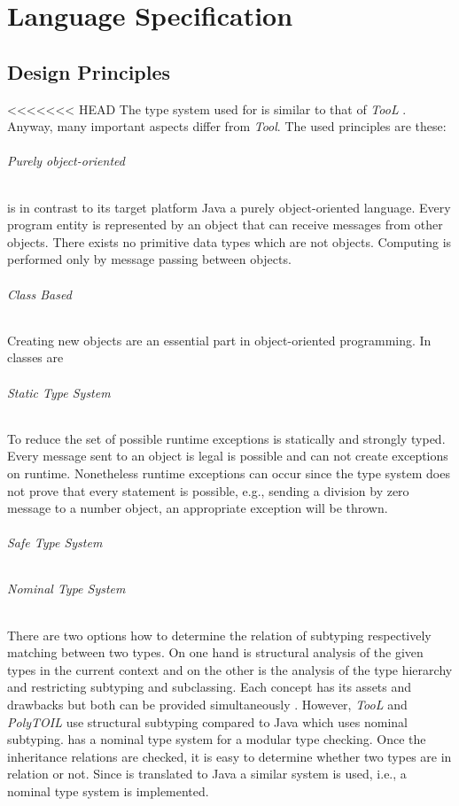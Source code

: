 \part{Language Specification}
\chapter{Design Principles}
<<<<<<< HEAD
The type system used for \ooplss is similar to that of \emph{TooL}
\cite{gawecki_tool:_1995}. Anyway, many important aspects differ from
\emph{Tool}. The used principles are these:

\paragraph{Purely object-oriented}
\ooplss is in contrast to its target platform Java a purely
object-oriented language. Every program entity is represented by an
object that can receive messages from other objects. There exists no
primitive data types which are not objects. Computing is performed only
by message passing between objects.

\paragraph{Class Based}
Creating new objects are an essential part in object-oriented
programming. In \ooplss classes are

\paragraph{Static Type System}
To reduce the set of possible runtime exceptions \ooplss is statically
and strongly typed. Every message sent to an object is legal is possible
and can not create exceptions on runtime. Nonetheless runtime exceptions
can occur since the type system does not prove that every statement is
possible, e.g., sending a division by zero message to a number object,
an appropriate exception will be thrown.

\paragraph{Safe Type System}

\paragraph{Nominal Type System}
There are two options how to determine the relation of subtyping
respectively matching between two types. On one hand is structural
analysis of the given types in the current context and on the other
is the analysis of the type hierarchy and restricting subtyping and
subclassing. Each concept has its assets and drawbacks but both can
be provided simultaneously \cite{malayeri_integrating_2008}. However,
\emph{TooL} and \emph{PolyTOIL} use structural subtyping compared to
Java which uses nominal subtyping. \ooplss has a nominal type system
for a modular type checking. Once the inheritance relations are checked,
it is easy to determine whether two types are in relation or not. Since
\ooplss is translated to Java a similar system is used, i.e., a nominal
type system is implemented.

